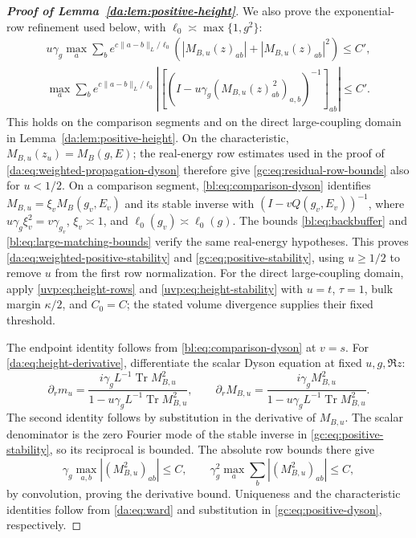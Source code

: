 \documentclass[11pt]{article}
\numberwithin{equation}{section}
\theoremstyle{remark}
\newcommand{\Tr}{\operatorname{Tr}}
\begin{document}
\begin{proof}[\textbf{Proof of Lemma~\ref{da:lem:positive-height}}]
We also prove the exponential-row refinement used below, with
$\ell_0\asymp\max\{1,g^2\}$:
\begin{equation}\label{da:eq:weighted-positive-stability}
 \begin{gathered}
 u\gamma_g\max_a\sum_b e^{c\|a-b\|_L/\ell_0}
       (|M_{B,u}(z)_{ab}|+|M_{B,u}(z)_{ab}|^2)\le C',\\
 \max_a\sum_b e^{c\|a-b\|_L/\ell_0}
 \left|\left[(I-u\gamma_g(M_{B,u}(z)_{ab}^{\,2})_{a,b})^{-1}
       \right]_{ab}\right|\le C'.
 \end{gathered}
\end{equation}
This holds on the comparison segments and on the direct large-coupling
domain in Lemma~\ref{da:lem:positive-height}.
On the characteristic, $M_{B,u}(z_u)=M_B(g,E)$; the real-energy
row estimates used in the proof of \eqref{da:eq:weighted-propagation-dyson}
therefore give \eqref{gc:eq:residual-row-bounds} also for $u<1/2$.
On a comparison segment, \eqref{bl:eq:comparison-dyson} identifies
$M_{B,u}=\xi_vM_B(g_v,E_v)$ and its stable inverse with
$(I-vQ(g_v,E_v))^{-1}$, where
$u\gamma_g\xi_v^2=v\gamma_{g_v}$, $\xi_v\asymp1$, and
$\ell_0(g_v)\asymp\ell_0(g)$.
The bounds \eqref{bl:eq:backbuffer} and
\eqref{bl:eq:large-matching-bounds} verify the same real-energy
hypotheses. This proves \eqref{da:eq:weighted-positive-stability}
and \eqref{gc:eq:positive-stability}, using $u\ge1/2$ to remove $u$
from the first row normalization.
For the direct large-coupling domain, apply
\eqref{uvp:eq:height-rows} and \eqref{uvp:eq:height-stability}
with $u=t$, $\tau=1$, bulk margin $\kappa/2$, and $C_0=C$;
the stated volume divergence supplies their fixed threshold.

The endpoint identity follows from \eqref{bl:eq:comparison-dyson} at
$v=s$. For \eqref{da:eq:height-derivative}, differentiate the scalar
Dyson equation at fixed $u,g,\Re z$:
\begin{equation}\label{da:eq:height-derivative-identities}
 \partial_r m_u=\frac{i\gamma_g L^{-1}\Tr M_{B,u}^2}
                         {1-u\gamma_g L^{-1}\Tr M_{B,u}^2},\qquad
 \partial_r M_{B,u}=\frac{i\gamma_g M_{B,u}^2}
                         {1-u\gamma_g L^{-1}\Tr M_{B,u}^2}.
\end{equation}
The second identity follows by substitution in the derivative of $M_{B,u}$.
The scalar denominator is the zero Fourier mode of the stable inverse
in \eqref{gc:eq:positive-stability}, so its reciprocal is bounded.
The absolute row bounds there give
\[
 \gamma_g\max_{a,b}|(M_{B,u}^2)_{ab}|\le C,\qquad
 \gamma_g^2\max_a\sum_b|(M_{B,u}^2)_{ab}|\le C,
\]
by convolution, proving the derivative bound. Uniqueness and the
characteristic identities follow from \eqref{da:eq:ward} and substitution
in \eqref{gc:eq:positive-dyson}, respectively.
\end{proof}
\end{document}
